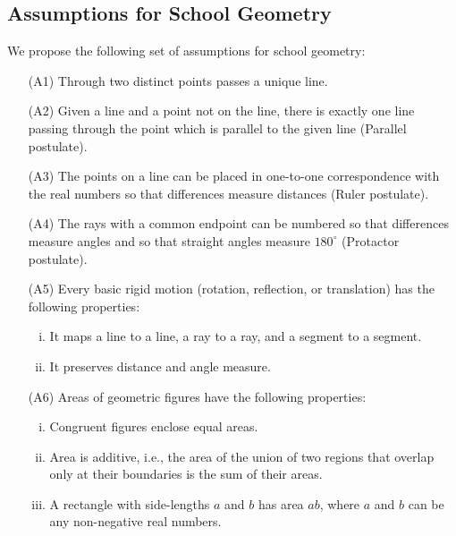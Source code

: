 \subsection{Assumptions for School Geometry}
We propose the following set of assumptions for school geometry:  
{\small
\begin{itemize}
\item[(A1)] Through two distinct points passes a unique line.
\item[(A2)] Given a line and a point not on the line, there is exactly one line passing through the point which is parallel to the given line (Parallel postulate).
\item[(A3)] The points on a line can be placed in one-to-one correspondence with the real numbers so that differences measure distances (Ruler postulate).  
\item[(A4)] The rays with a common endpoint can be numbered so that differences measure angles and so that straight angles measure $180^\circ$ (Protactor postulate). 
\item[(A5)] Every basic rigid motion (rotation, reflection, or translation) has the following properties:
\begin{enumerate}[(i)]\parskip0pt
\item It maps a line to a line, a ray to a ray, and a segment to a segment.
\item It preserves distance and angle measure.
\end{enumerate}
\item [(A6)] Areas of geometric figures have the following properties: 
\begin{enumerate}[(i)]%
\item Congruent figures enclose equal areas.
\item Area is additive, i.e., the area of the union of two regions that overlap only at their boundaries is the sum of their areas. 
\item A rectangle with side-lengths $a$ and $b$ has area $ab$, where $a$ and $b$ can be any non-negative real numbers.
\end{enumerate}

\end{itemize}
}

